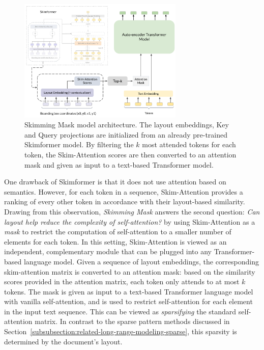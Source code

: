 \begin{figure}
    \centering
    \includegraphics[width=0.7\textwidth]{images/chapter3/skimmingmask-architecture.pdf}
    \caption{Skimming Mask model architecture. The layout embeddings, Key and Query projections are initialized from an already pre-trained Skimformer model. By filtering the $k$ most attended tokens for each token, the Skim-Attention scores are then converted to an attention mask and given as input to a text-based Transformer model.}
    \label{fig:skimmingmask-architecture}
\end{figure}

One drawback of Skimformer is that it does not use attention based on semantics. However, for each token in a sequence, Skim-Attention provides a ranking of every other token in accordance with their layout-based similarity. Drawing from this observation, \emph{Skimming Mask} answers the second question: \textit{Can layout help reduce the complexity of self-attention?} by using Skim-Attention as a \textit{mask} to restrict the computation of self-attention to a smaller number of elements for each token. In this setting, Skim-Attention is viewed as an independent, complementary module that can be plugged into any Transformer-based language model. Given a sequence of layout embeddings, the corresponding skim-attention matrix is converted to an attention mask: based on the similarity scores provided in the attention matrix, each token only attends to at most $k$ tokens. The mask is given as input to a text-based Transformer language model with vanilla self-attention, and is used to restrict self-attention for each element in the input text sequence. This can be viewed as \emph{sparsifying} the standard self-attention matrix. In contrast to the sparse pattern methods discussed in Section~\ref{subsubsection:related-long-range-modeling-sparse}, this sparsity is determined by the document's layout.


